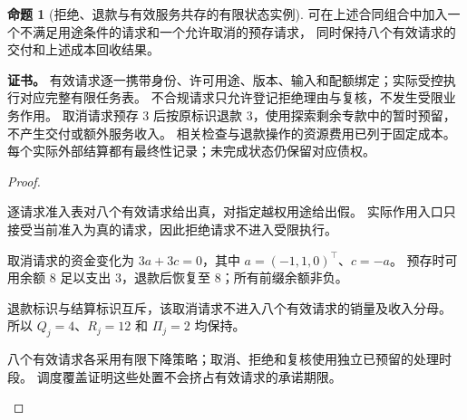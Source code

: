 \documentclass[UTF8,12pt,a4paper,openany,fontset=none,zihao=false]{ctexrep}
\theoremstyle{definition}
\newtheorem{proposition}{命题}[chapter]
\newenvironment{certificate}{\par\noindent\textbf{证书。}\ignorespaces}{\par}
\newcommand{\1}{\mathbf 1}
\begin{document}
\begin{proposition}[拒绝、退款与有效服务共存的有限状态实例]
\label{joint:service-state-model}
可在上述合同组合中加入一个不满足用途条件的请求和一个允许取消的预存请求，
同时保持八个有效请求的交付和上述成本回收结果。
\end{proposition}
\begin{certificate}
有效请求逐一携带身份、许可用途、版本、输入和配额绑定；实际受控执行对应完整有限任务表。
不合规请求只允许登记拒绝理由与复核，不发生受限业务作用。
取消请求预存 3 后按原标识退款 3，使用探索剩余专款中的暂时预留，不产生交付或额外服务收入。
相关检查与退款操作的资源费用已列于固定成本。
每个实际外部结算都有最终性记录；未完成状态仍保留对应债权。
\end{certificate}
\begin{proof}
\begin{semanticsteps}
\item 逐请求准入表对八个有效请求给出真，对指定越权用途给出假。
实际作用入口只接受当前准入为真的请求，因此拒绝请求不进入受限执行。
\item 取消请求的资金变化为 \(3a+3c=0\)，其中 \(a=(-1,1,0)^\top\)、\(c=-a\)。
预存时可用余额 8 足以支出 3，退款后恢复至 8；所有前缀余额非负。
\item 退款标识与结算标识互斥，该取消请求不进入八个有效请求的销量及收入分母。
所以 \(Q_j=4\)、\(R_j=12\) 和 \(\Pi_j=2\) 均保持。
\item 八个有效请求各采用有限下降策略；取消、拒绝和复核使用独立已预留的处理时段。
调度覆盖证明这些处置不会挤占有效请求的承诺期限。
\end{semanticsteps}
\end{proof}
\end{document}

